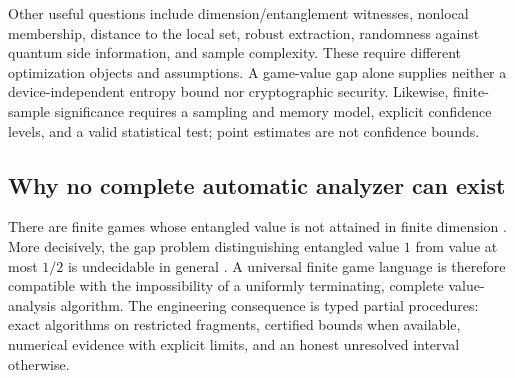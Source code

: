 Other useful questions include dimension/entanglement witnesses, nonlocal
membership, distance to the local set, robust extraction, randomness against
quantum side information, and sample complexity. These require different
optimization objects and assumptions. A game-value gap alone supplies neither
a device-independent entropy bound nor cryptographic security. Likewise,
finite-sample significance requires a sampling and memory model, explicit
confidence levels, and a valid statistical test; point estimates are not
confidence bounds.

\subsection{Why no complete automatic analyzer can exist}
There are finite games whose entangled value is not attained in finite
dimension \cite{slofstra2019}. More decisively, the gap problem distinguishing
entangled value $1$ from value at most $1/2$ is undecidable in general
\cite{ji2020}. A universal finite game language is therefore compatible with
the impossibility of a uniformly terminating, complete value-analysis
algorithm. The engineering consequence is typed partial procedures: exact
algorithms on restricted fragments, certified bounds when available, numerical
evidence with explicit limits, and an honest unresolved interval otherwise.
